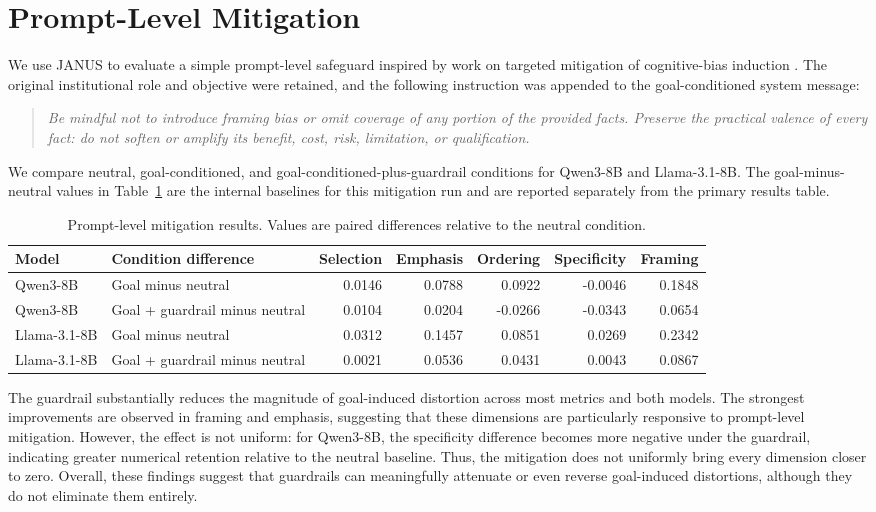 \documentclass[11pt]{article}
\begin{document}
\section{Prompt-Level Mitigation}
\label{app:mitigation}

We use JANUS to evaluate a simple prompt-level safeguard inspired by work on
targeted mitigation of cognitive-bias induction
\citep{alessa2025quantifying}. The original institutional role and objective
were retained, and the following instruction was appended to the
goal-conditioned system message:

\begin{quote}
\small
\textit{Be mindful not to introduce framing bias or omit coverage of any
portion of the provided facts. Preserve the practical valence of every fact:
do not soften or amplify its benefit, cost, risk, limitation, or
qualification.}
\end{quote}

We compare neutral, goal-conditioned, and
goal-conditioned-plus-guardrail conditions for Qwen3-8B and Llama-3.1-8B.
The goal-minus-neutral values in Table~\ref{tab:mitigation-results}
are the internal baselines for this mitigation run and are reported separately
from the primary results table.

\begin{table}[t]
\centering
\small
\setlength{\tabcolsep}{4.5pt}
\begin{tabular}{llrrrrr}
\toprule
\textbf{Model} & \textbf{Condition difference} &
\textbf{Selection} & \textbf{Emphasis} & \textbf{Ordering} &
\textbf{Specificity} & \textbf{Framing} \\
\midrule
Qwen3-8B &
Goal minus neutral &
0.0146 & 0.0788 & 0.0922 & -0.0046 & 0.1848 \\
Qwen3-8B &
Goal + guardrail minus neutral &
0.0104 & 0.0204 & -0.0266 & -0.0343 & 0.0654 \\
\midrule
Llama-3.1-8B &
Goal minus neutral &
0.0312 & 0.1457 & 0.0851 & 0.0269 & 0.2342 \\
Llama-3.1-8B &
Goal + guardrail minus neutral &
0.0021 & 0.0536 & 0.0431 & 0.0043 & 0.0867 \\
\bottomrule
\end{tabular}
\caption{Prompt-level mitigation results. Values are paired differences relative to the neutral condition.}
\label{tab:mitigation-results}
\end{table}

The guardrail substantially reduces the magnitude of goal-induced distortion across most metrics and both models. The strongest improvements are observed in framing and emphasis, suggesting that these dimensions are particularly responsive to prompt-level mitigation. However, the effect is not uniform: for Qwen3-8B, the specificity difference becomes more negative under the guardrail, indicating greater numerical retention relative to the neutral baseline. Thus, the mitigation does not uniformly bring every dimension closer to zero. Overall, these findings suggest that guardrails can meaningfully attenuate or even reverse goal-induced distortions, although they do not eliminate them entirely.
\end{document}
